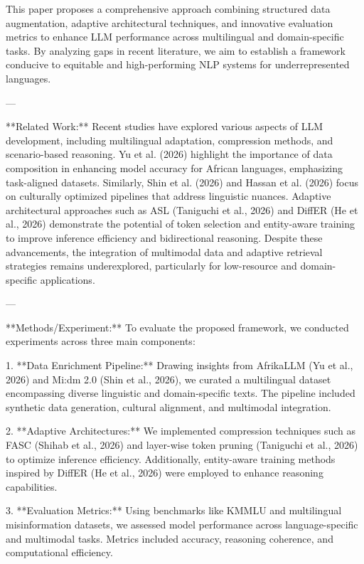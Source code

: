 This paper proposes a comprehensive approach combining structured data augmentation, adaptive architectural techniques, and innovative evaluation metrics to enhance LLM performance across multilingual and domain-specific tasks. By analyzing gaps in recent literature, we aim to establish a framework conducive to equitable and high-performing NLP systems for underrepresented languages.

---

**Related Work:**  
Recent studies have explored various aspects of LLM development, including multilingual adaptation, compression methods, and scenario-based reasoning. Yu et al. (2026) highlight the importance of data composition in enhancing model accuracy for African languages, emphasizing task-aligned datasets. Similarly, Shin et al. (2026) and Hassan et al. (2026) focus on culturally optimized pipelines that address linguistic nuances. Adaptive architectural approaches such as ASL (Taniguchi et al., 2026) and DiffER (He et al., 2026) demonstrate the potential of token selection and entity-aware training to improve inference efficiency and bidirectional reasoning. Despite these advancements, the integration of multimodal data and adaptive retrieval strategies remains underexplored, particularly for low-resource and domain-specific applications.

---

**Methods/Experiment:**  
To evaluate the proposed framework, we conducted experiments across three main components:

1. **Data Enrichment Pipeline:**  
   Drawing insights from AfrikaLLM (Yu et al., 2026) and Mi:dm 2.0 (Shin et al., 2026), we curated a multilingual dataset encompassing diverse linguistic and domain-specific texts. The pipeline included synthetic data generation, cultural alignment, and multimodal integration.

2. **Adaptive Architectures:**  
   We implemented compression techniques such as FASC (Shihab et al., 2026) and layer-wise token pruning (Taniguchi et al., 2026) to optimize inference efficiency. Additionally, entity-aware training methods inspired by DiffER (He et al., 2026) were employed to enhance reasoning capabilities.

3. **Evaluation Metrics:**  
   Using benchmarks like KMMLU and multilingual misinformation datasets, we assessed model performance across language-specific and multimodal tasks. Metrics included accuracy, reasoning coherence, and computational efficiency.

